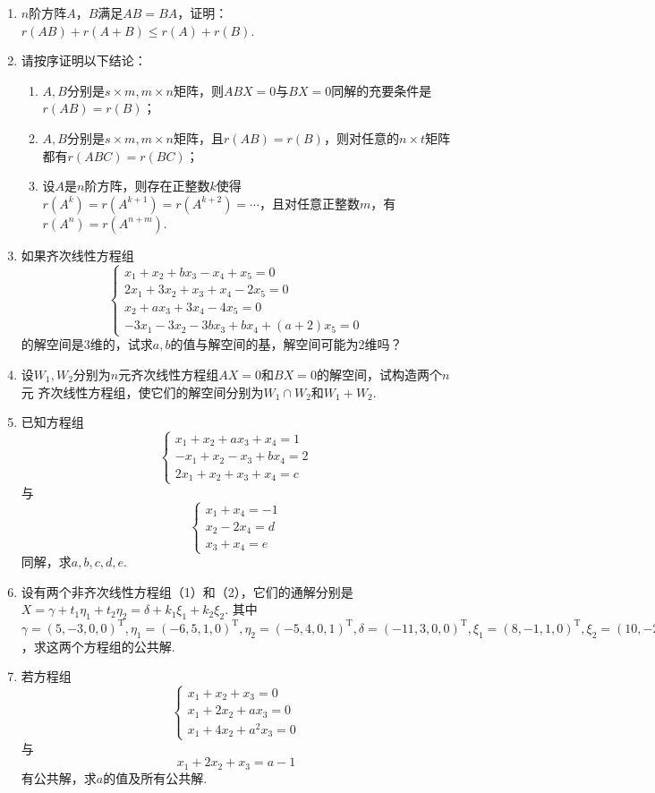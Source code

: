\begin{enumerate}
	\item $n$阶方阵$A$，$B$满足$AB=BA$，证明：$r(AB)+r(A+B)\le r(A)+r(B)$.
	\item 请按序证明以下结论：
	\begin{enumerate}[label=(\arabic*)]
        \item $A,B$分别是$s \times m,m \times n$矩阵，则$ABX=0$与$BX=0$同解的充要条件是$r(AB)=r(B)$；
        \item $A,B$分别是$s \times m,m \times n$矩阵，且$r(AB)=r(B)$，则对任意的$n \times t$矩阵都有$r(ABC)=r(BC)$；
        \item 设$A$是$n$阶方阵，则存在正整数$k$使得$r(A^k)=r(A^{k+1})=r(A^{k+2})=\cdots$，且对任意正整数$m$，有$r(A^n)=r(A^{n+m})$.
    \end{enumerate}
    \item 如果齐次线性方程组$$\begin{cases}
		x_1+x_2+bx_3-x_4+x_5=0 \\
		2x_1+3x_2+x_3+x_4-2x_5=0 \\
		x_2+ax_3+3x_4-4x_5=0 \\
		-3x_1-3x_2-3bx_3+bx_4+(a+2)x_5=0
	\end{cases}$$
	的解空间是3维的，试求$a,b$的值与解空间的基，解空间可能为2维吗？
	\item 设$W_1,W_2$分别为$n$元齐次线性方程组$AX=0$和$BX=0$的解空间，试构造两个$n$元
	齐次线性方程组，使它们的解空间分别为$W_1 \cap W_2$和$W_1+W_2$.
	\item 已知方程组$$\begin{cases}
		x_1+x_2+ax_3+x_4=1 \\ -x_1+x_2-x_3+bx_4=2 \\ 2x_1+x_2+x_3+x_4=c
	\end{cases}$$与$$\begin{cases}
		x_1+x_4=-1 \\ x_2-2x_4=d \\ x_3+x_4=e
	\end{cases}$$同解，求$a,b,c,d,e$.
	\item 设有两个非齐次线性方程组（1）和（2），它们的通解分别是$X=\gamma+t_1\eta_1+t_2\eta_2=\delta+k_1\xi_1+k_2\xi_2$.
	其中$\gamma=(5,-3,0,0)^\mathrm{T},\eta_1=(-6,5,1,0)^\mathrm{T},\eta_2=(-5,4,0,1)^\mathrm{T},
	\delta=(-11,3,0,0)^\mathrm{T},\xi_1=(8,-1,1,0)^\mathrm{T},\xi_2=(10,-2,0,1)^\mathrm{T}$，求这两个方程组的公共解.
	\item 若方程组
    \[\begin{cases}
		x_1+x_2+x_3=0 \\ x_1+2x_2+ax_3=0 \\ x_1+4x_2+a^2x_3=0
	\end{cases}\]与
    \[x_1+2x_2+x_3=a-1\]
    有公共解，求$a$的值及所有公共解.
\end{enumerate}

